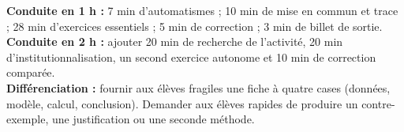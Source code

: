 \ifprof
\begin{methode}
\textbf{Conduite en 1 h :} 7 min d'automatismes ; 10 min de mise en commun et trace ; 28 min d'exercices essentiels ; 5 min de correction ; 3 min de billet de sortie.\\
\textbf{Conduite en 2 h :} ajouter 20 min de recherche de l'activité, 20 min d'institutionnalisation, un second exercice autonome et 10 min de correction comparée.\\
\textbf{Différenciation :} fournir aux élèves fragiles une fiche à quatre cases (données, modèle, calcul, conclusion). Demander aux élèves rapides de produire un contre-exemple, une justification ou une seconde méthode.
\end{methode}
\fi
